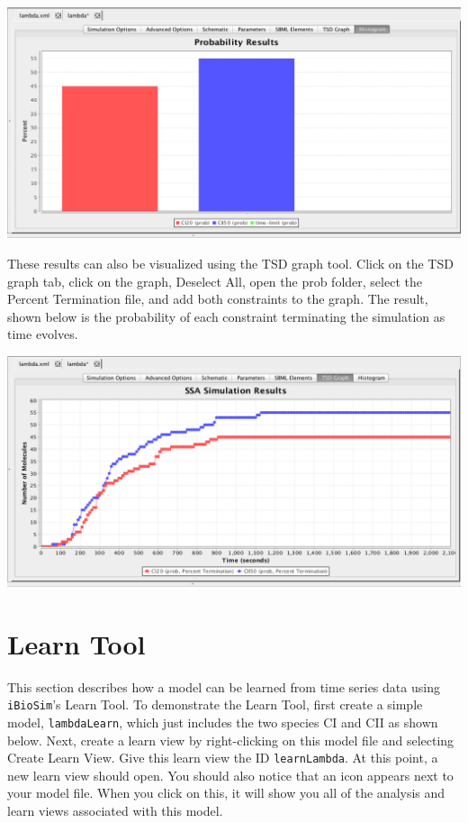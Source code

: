 \documentclass[titlepage,11pt]{article}
\begin{document}
\begin{center} 
\includegraphics[width=160mm]{screenshots/probResults}
\end{center}

These results can also be visualized using the TSD graph tool.  Click on the TSD graph tab, click on the graph, Deselect All, open the prob folder, select the Percent Termination file, and add both constraints to the graph.  The result, shown below is the probability of each constraint terminating the simulation as time evolves.  

\begin{center} 
\includegraphics[width=160mm]{screenshots/probResultsTSD}
\end{center}

\section{Learn Tool}

This section describes how a model can be learned from time series data using {\tt iBioSim}'s Learn Tool.  To demonstrate the Learn Tool, first create a simple model, {\tt lambdaLearn}, which just includes the two species CI and CII as shown below.  Next, create a learn view by right-clicking on this model file and selecting Create Learn View.  Give this learn view the ID {\tt learnLambda}.  At this point, a new learn view should open.  You should also notice that an icon appears next to your model file.  When you click on this, it will show you all of the analysis and learn views associated with this model.
\end{document}
